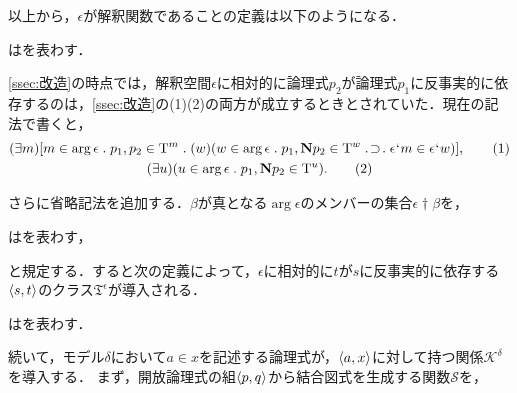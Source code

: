 以上から，$\epsilon$が解釈関数であることの定義は以下のようになる．
\begin{df}
\label{df:解釈空間}
はを表わす．
\end{df}

\ref{ssec:改造}の時点では，解釈空間$\epsilon$に相対的に論理式$p_2$が論理式$p_1$に反事実的に依存するのは，\ref{ssec:改造}の(1)(2)の両方が成立するときとされていた．現在の記法で書くと，
\begin{gather}
    (\exists m)[
        m\in\arg\epsilon\con{1}p_1,p_2\in \mathrm{T}^m\con{1}
        (w)(w\in\arg \epsilon\con{1}p_1,\mathbf{N}p_2\in \mathrm{T}^w\case{1}{1}{1}\epsilon\fap m\in\epsilon\fap w)
    ],\tag{1}\\
    (\exists u)(u\in\arg\epsilon\con{1}p_1,\mathbf{N}p_2\in \mathrm{T}^u).\tag{2}
\end{gather}

\noindent さらに省略記法を追加する．$\beta$が真となる$\arg\epsilon$のメンバーの集合$ \epsilon\dagger\beta $を，
\begin{df}
\label{df:真理化する到達可能モデルの集合}
\kagi{$
    \epsilon\dagger\beta
$}はを表わす，
\end{df}
\noindent と規定する．すると次の定義によって，$\epsilon$に相対的に$t$が$s$に反事実的に依存する$\langle s,t \rangle$のクラス$\mathfrak{T}^\epsilon$が導入される．

\begin{df}
\label{df:反事実的依存関係}
はを表わす．
\end{df}

続いて，モデル$\delta$において$ a\in x $を記述する論理式が，$ \langle a,x \rangle $に対して持つ関係$ \mathcal{K}^\delta $を導入する．
まず，開放論理式の組$ \langle p,q \rangle $から結合図式を生成する関数$ \mathcal{S} $を，

